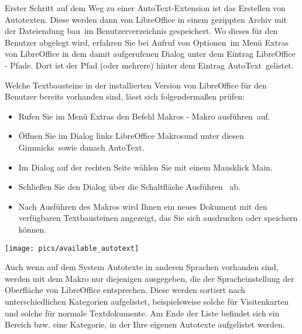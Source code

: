 \documentclass[a4paper,10pt,pagesize,titlepage]{scrbook}
\begin{document}
Erster Schritt auf dem Weg zu einer AutoText-Extension ist das Erstellen von Autotexten. Diese werden dann von LibreOffice in einem gezippten Archiv mit der Dateiendung \glqq bau\grqq~im Benutzerverzeichnis gespeichert. Wo dieses für den Benutzer abgelegt wird, erfahren Sie bei Aufruf von \glqq Optionen\grqq~im Menü Extras von LibreOffice in dem damit aufgerufenen Dialog unter dem Eintrag \glqq LibreOffice - Pfade\grqq. Dort ist der Pfad (oder mehrere) hinter dem Eintrag \glqq AutoText\grqq~gelistet.

Welche Textbausteine in der installierten Version von LibreOffice für den Benutzer bereits vorhanden sind, lässt sich folgendermaßen prüfen:
\begin{itemize}
	\item Rufen Sie im Menü Extras den Befehl \glqq Makros - Makro ausführen\grqq~auf.
	\item Öffnen Sie im Dialog links \glqq LibreOffice Makros\grqq und unter diesen \glqq Gimmicks\grqq~sowie danach \glqq AutoText\grqq.
	\item Im Dialog auf der rechten Seite wählen Sie mit einem Mausklick \glqq Main\grqq.
	\item Schließen Sie den Dialog über die Schaltfläche \glqq Ausführen\grqq~ ab.
	\item Nach Ausführen des Makros wird Ihnen ein neues Dokument mit den verfügbaren Textbausteinen angezeigt, das Sie sich ausdrucken oder speichern können.
\end{itemize}

\begin{center}
	\captionsetup{type=figure}
	\texttt{[image: pics/available\_autotext]}
	\label{fig:available_autotext}
\end{center}

Auch wenn auf dem System Autotexte in anderen Sprachen vorhanden sind, werden mit dem Makro nur diejenigen ausgegeben, die der Spracheinstellung der Oberfläche von LibreOffice entsprechen. Diese werden sortiert nach unterschiedlichen Kategorien aufgelistet, beispielsweise solche für Visitenkarten und solche für normale Textdokumente. Am Ende der Liste befindet sich ein Bereich bzw. eine Kategorie, in der Ihre eigenen Autotexte aufgelistet werden.
\end{document}
